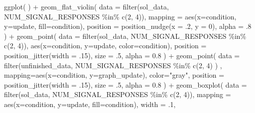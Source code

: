 \documentclass[
]{book}
\newenvironment{Shaded}{\begin{snugshade}}{\end{snugshade}}
\newcommand{\AttributeTok}[1]{\textcolor[rgb]{0.77,0.63,0.00}{#1}}
\newcommand{\DecValTok}[1]{\textcolor[rgb]{0.00,0.00,0.81}{#1}}
\newcommand{\FloatTok}[1]{\textcolor[rgb]{0.00,0.00,0.81}{#1}}
\newcommand{\FunctionTok}[1]{\textcolor[rgb]{0.00,0.00,0.00}{#1}}
\newcommand{\NormalTok}[1]{#1}
\newcommand{\SpecialCharTok}[1]{\textcolor[rgb]{0.00,0.00,0.00}{#1}}
\newcommand{\StringTok}[1]{\textcolor[rgb]{0.31,0.60,0.02}{#1}}
\begin{document}
\begin{Shaded}
\begin{Highlighting}[]
\FunctionTok{ggplot}\NormalTok{( ) }\SpecialCharTok{+}
  \FunctionTok{geom\_flat\_violin}\NormalTok{(}
    \AttributeTok{data =} \FunctionTok{filter}\NormalTok{(sol\_data, NUM\_SIGNAL\_RESPONSES }\SpecialCharTok{\%in\%} \FunctionTok{c}\NormalTok{(}\DecValTok{2}\NormalTok{, }\DecValTok{4}\NormalTok{)),}
    \AttributeTok{mapping =} \FunctionTok{aes}\NormalTok{(}\AttributeTok{x=}\NormalTok{condition, }\AttributeTok{y=}\NormalTok{update, }\AttributeTok{fill=}\NormalTok{condition),}
    \AttributeTok{position =} \FunctionTok{position\_nudge}\NormalTok{(}\AttributeTok{x =}\NormalTok{ .}\DecValTok{2}\NormalTok{, }\AttributeTok{y =} \DecValTok{0}\NormalTok{),}
    \AttributeTok{alpha =}\NormalTok{ .}\DecValTok{8}
\NormalTok{  ) }\SpecialCharTok{+}
  \FunctionTok{geom\_point}\NormalTok{(}
    \AttributeTok{data =} \FunctionTok{filter}\NormalTok{(sol\_data, NUM\_SIGNAL\_RESPONSES }\SpecialCharTok{\%in\%} \FunctionTok{c}\NormalTok{(}\DecValTok{2}\NormalTok{, }\DecValTok{4}\NormalTok{)),}
    \FunctionTok{aes}\NormalTok{(}\AttributeTok{x=}\NormalTok{condition, }\AttributeTok{y=}\NormalTok{update, }\AttributeTok{color=}\NormalTok{condition),}
    \AttributeTok{position =} \FunctionTok{position\_jitter}\NormalTok{(}\AttributeTok{width =}\NormalTok{ .}\DecValTok{15}\NormalTok{),}
    \AttributeTok{size =}\NormalTok{ .}\DecValTok{5}\NormalTok{,}
    \AttributeTok{alpha =} \FloatTok{0.8}
\NormalTok{  ) }\SpecialCharTok{+}
  \FunctionTok{geom\_point}\NormalTok{(}
    \AttributeTok{data =} \FunctionTok{filter}\NormalTok{(unfinished\_data, NUM\_SIGNAL\_RESPONSES }\SpecialCharTok{\%in\%} \FunctionTok{c}\NormalTok{(}\DecValTok{2}\NormalTok{, }\DecValTok{4}\NormalTok{) ) ,}
    \AttributeTok{mapping=}\FunctionTok{aes}\NormalTok{(}\AttributeTok{x=}\NormalTok{condition, }\AttributeTok{y=}\NormalTok{graph\_update),}
    \AttributeTok{color=}\StringTok{"gray"}\NormalTok{,}
    \AttributeTok{position =} \FunctionTok{position\_jitter}\NormalTok{(}\AttributeTok{width =}\NormalTok{ .}\DecValTok{15}\NormalTok{),}
    \AttributeTok{size =}\NormalTok{ .}\DecValTok{5}\NormalTok{,}
    \AttributeTok{alpha =} \FloatTok{0.8}
\NormalTok{  ) }\SpecialCharTok{+}
  \FunctionTok{geom\_boxplot}\NormalTok{(}
    \AttributeTok{data =} \FunctionTok{filter}\NormalTok{(sol\_data, NUM\_SIGNAL\_RESPONSES }\SpecialCharTok{\%in\%} \FunctionTok{c}\NormalTok{(}\DecValTok{2}\NormalTok{, }\DecValTok{4}\NormalTok{)),}
    \AttributeTok{mapping =} \FunctionTok{aes}\NormalTok{(}\AttributeTok{x=}\NormalTok{condition, }\AttributeTok{y=}\NormalTok{update, }\AttributeTok{fill=}\NormalTok{condition),}
    \AttributeTok{width =}\NormalTok{ .}\DecValTok{1}\NormalTok{,}

\end{Highlighting}
\end{Shaded}
\end{document}
